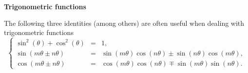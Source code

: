\documentclass[12pt,a4paper,anypage]{report}
\begin{document}
{\bf Trigonometric functions}

The following three identities (among others) are often useful when dealing with trigonometric functions
\begin{equation*}
  \left\{
  \begin{array}{rcl}
    \sin^2(\theta)+\cos^2(\theta)&=&1,\\
    \sin(m\theta \pm n\theta)&=&\sin(m\theta)\cos(n\theta)\pm\sin(n\theta)\cos (m\theta),\\
    \cos(m\theta\pm n\theta)&=&\cos (m\theta)\cos (n\theta) \mp \sin(m\theta)\sin (n\theta).
    \end{array}
  \right.
\end{equation*}
\end{document}
